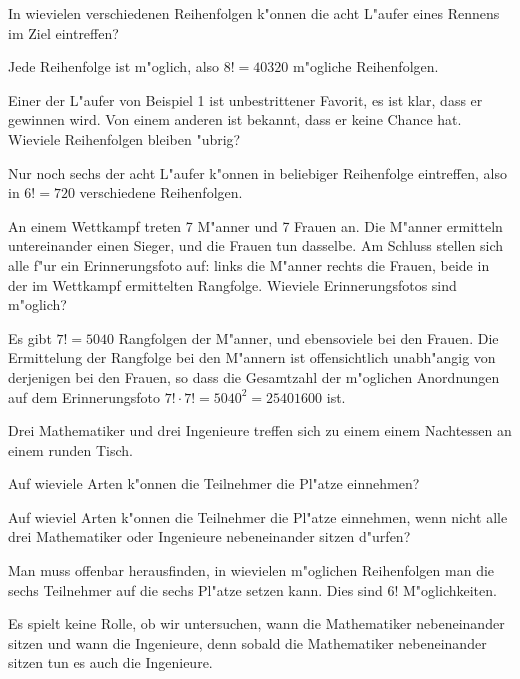 \begin{beispiele}
\item In wievielen verschiedenen Reihenfolgen k"onnen die acht L"aufer
eines Rennens im Ziel eintreffen?

\begin{loesung}
Jede Reihenfolge ist m"oglich, also $8!=40320$ m"ogliche Reihenfolgen.
\end{loesung}

\item Einer der L"aufer von Beispiel 1 ist unbestrittener Favorit,
es ist klar, dass er gewinnen wird.
Von einem anderen ist bekannt, dass er keine Chance hat.
Wieviele Reihenfolgen bleiben "ubrig?

\begin{loesung}
Nur noch sechs der acht L"aufer k"onnen in beliebiger Reihenfolge
eintreffen, also in $6!=720$ verschiedene Reihenfolgen.
\end{loesung}

\item An einem Wettkampf treten 7 M"anner und 7 Frauen an.
Die M"anner
ermitteln untereinander einen Sieger, und die Frauen tun dasselbe.
Am Schluss stellen sich alle f"ur ein Erinnerungsfoto auf: links
die M"anner rechts die Frauen, beide in der im Wettkampf ermittelten
Rangfolge.
Wieviele Erinnerungsfotos sind m"oglich?

\begin{loesung}
Es gibt $7!=5040$ Rangfolgen der M"anner, und ebensoviele bei den
Frauen.
Die Ermittelung der Rangfolge bei den M"annern ist offensichtlich
unabh"angig von derjenigen bei den Frauen, so dass die Gesamtzahl der
m"oglichen Anordnungen auf dem Erinnerungsfoto $7!\cdot 7!=5040^2=25401600$
ist.
\end{loesung}

\item
\label{nachtessen}
Drei Mathematiker und drei Ingenieure treffen sich zu einem
einem Nachtessen an einem runden Tisch.
\begin{teilaufgaben}
\item
Auf wieviele Arten k"onnen die Teilnehmer die Pl"atze einnehmen?
\item
Auf wieviel Arten k"onnen 
die Teilnehmer die Pl"atze einnehmen, wenn nicht alle drei Mathematiker
oder Ingenieure nebeneinander sitzen d"urfen?
\end{teilaufgaben}

\begin{loesung}
\begin{teilaufgaben}
\item
Man muss offenbar herausfinden, in wievielen m"oglichen Reihenfolgen
man die sechs Teilnehmer auf die sechs Pl"atze setzen kann.
Dies sind $6!$ M"oglichkeiten.
\item
Es spielt keine Rolle, ob wir untersuchen, wann die Mathematiker 
nebeneinander sitzen und wann die Ingenieure, denn sobald die Mathematiker
nebeneinander sitzen tun es auch die Ingenieure.


\end{teilaufgaben}
\end{loesung}
\end{beispiele}
